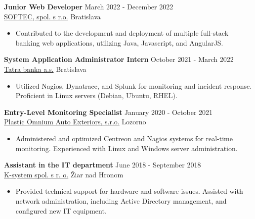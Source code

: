 \documentclass[12pt]{article}
\begin{document}
{{\noindent
{\bfseries Junior Web Developer} \hfill March 2022 - December 2022 \\  
\noindent \href{https://www.softec.sk/en/about-us}{SOFTEC, spol. s r.o.} \hfill Bratislava 
\begin{itemize} \itemsep -2pt %
	\item Contributed to the development and deployment of multiple full-stack banking web applications, utilizing Java, Javascript, and AngularJS.
\end{itemize}


\noindent
{\bfseries System Application Administrator Intern} \hfill October 2021 - March 2022 \\  
\noindent \href{https://www.tatrabanka.sk/en/about-bank/about-tatra-banka/}{Tatra banka a.s.} \hfill Bratislava 
\begin{itemize} \itemsep -2pt %
\item Utilized Nagios, Dynatrace, and Splunk for monitoring and incident response. Proficient in Linux servers (Debian, Ubuntu, RHEL).
\end{itemize}

\noindent
{\bfseries Entry-Level Monitoring Specialist} \hfill January 2020 - October 2021 \\  
\noindent \href{https://www.opmobility.com/en/plastic-omnium-is-now-opmobility/}{Plastic Omnium Auto Exteriors, s.r.o.} \hfill Lozorno 
\begin{itemize} \itemsep -2pt %
	\item Administered and optimized Centreon and Nagios systems for real-time monitoring. Experienced with Linux and Windows server administration.
\end{itemize}

\noindent
{\bfseries Assistant in the IT department} \hfill June 2018 - September 2018 \\  
\noindent  \href{https://www.ksystem.sk/}{K-system spol. s r. o.} \hfill Žiar nad Hronom   
\begin{itemize} \itemsep -2pt %
\item Provided technical support for hardware and software issues. Assisted with network administration, including Active Directory management, and configured new IT equipment.
\end{itemize}


}}
\end{document}
